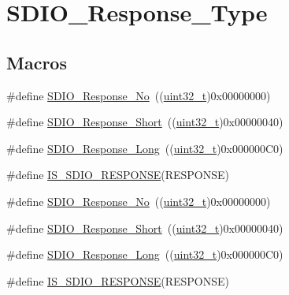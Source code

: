 \hypertarget{group___s_d_i_o___response___type}{}\section{S\+D\+I\+O\+\_\+\+Response\+\_\+\+Type}
\label{group___s_d_i_o___response___type}
\subsection*{Macros}
\begin{DoxyCompactItemize}
\item 
\#define \hyperlink{group___s_d_i_o___response___type_ga308b8ef0e79ba451644dda923bb3ac41}{S\+D\+I\+O\+\_\+\+Response\+\_\+\+No}~((\hyperlink{_p_e___types_8h_a33594304e786b158f3fb30289278f5af}{uint32\+\_\+t})0x00000000)
\item 
\#define \hyperlink{group___s_d_i_o___response___type_ga1f61768f90641648fd5c12e8d2f7e508}{S\+D\+I\+O\+\_\+\+Response\+\_\+\+Short}~((\hyperlink{_p_e___types_8h_a33594304e786b158f3fb30289278f5af}{uint32\+\_\+t})0x00000040)
\item 
\#define \hyperlink{group___s_d_i_o___response___type_ga1a11a8750612b344214f846784046bb0}{S\+D\+I\+O\+\_\+\+Response\+\_\+\+Long}~((\hyperlink{_p_e___types_8h_a33594304e786b158f3fb30289278f5af}{uint32\+\_\+t})0x000000\+C0)
\item 
\#define \hyperlink{group___s_d_i_o___response___type_gae4df2359c9b637694b9baa220c16e062}{I\+S\+\_\+\+S\+D\+I\+O\+\_\+\+R\+E\+S\+P\+O\+N\+SE}(R\+E\+S\+P\+O\+N\+SE)
\item 
\#define \hyperlink{group___s_d_i_o___response___type_ga308b8ef0e79ba451644dda923bb3ac41}{S\+D\+I\+O\+\_\+\+Response\+\_\+\+No}~((\hyperlink{_p_e___types_8h_a33594304e786b158f3fb30289278f5af}{uint32\+\_\+t})0x00000000)
\item 
\#define \hyperlink{group___s_d_i_o___response___type_ga1f61768f90641648fd5c12e8d2f7e508}{S\+D\+I\+O\+\_\+\+Response\+\_\+\+Short}~((\hyperlink{_p_e___types_8h_a33594304e786b158f3fb30289278f5af}{uint32\+\_\+t})0x00000040)
\item 
\#define \hyperlink{group___s_d_i_o___response___type_ga1a11a8750612b344214f846784046bb0}{S\+D\+I\+O\+\_\+\+Response\+\_\+\+Long}~((\hyperlink{_p_e___types_8h_a33594304e786b158f3fb30289278f5af}{uint32\+\_\+t})0x000000\+C0)
\item 
\#define \hyperlink{group___s_d_i_o___response___type_gae4df2359c9b637694b9baa220c16e062}{I\+S\+\_\+\+S\+D\+I\+O\+\_\+\+R\+E\+S\+P\+O\+N\+SE}(R\+E\+S\+P\+O\+N\+SE)
\end{DoxyCompactItemize}


